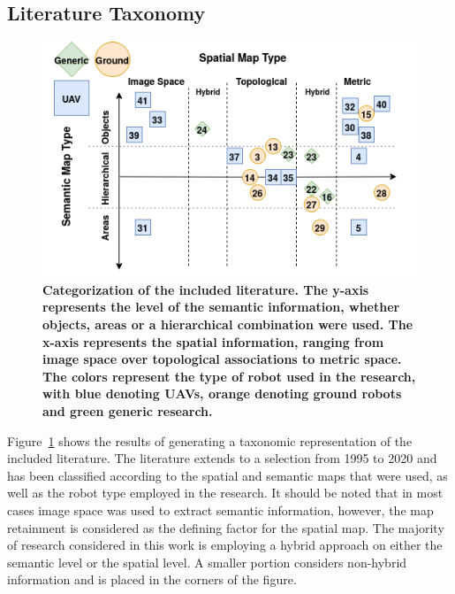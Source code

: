 \documentclass[twocolumn,letterpaper]{IEEEAerospaceCLS}  %
\begin{document}
\subsection{Literature Taxonomy} \label{ssec:ResLit}
\begin{figure}
    \centering
    \includegraphics[width=\textwidth]{Lit-14.png}
    \caption{\bf{
        Categorization of the included literature. The y-axis represents the level of the semantic information, whether objects, areas or a hierarchical combination were used. The x-axis represents the spatial information, ranging from image space over topological associations to metric space. The colors represent the type of robot used in the research, with blue denoting UAVs, orange denoting ground robots and green generic research.
    }}
    \label{fig:LitRes}
\end{figure}
Figure~\ref{fig:LitRes} shows the results of generating a taxonomic representation of the included literature. The literature extends to a selection from 1995 to 2020 and has been classified according to the spatial and semantic maps that were used, as well as the robot type employed in the research. It should be noted that in most cases image space was used to extract semantic information, however, the map retainment is considered as the defining factor for the spatial map. The majority  of research considered in this work is employing a hybrid approach on either the semantic level or the spatial level. A smaller portion considers non-hybrid information and is placed in the corners of the figure.  
\end{document}
